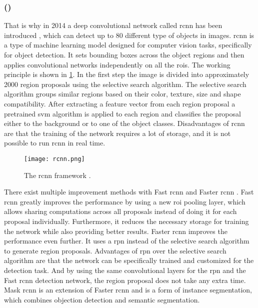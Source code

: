 \subsubsection{ ()}
\label{sssec:rcnn}
That is why in 2014 a deep convolutional network called \gls{rcnn} has been introduced \cite{Girshick2014}, which can detect up to 80 different type of objects in images.
\gls{rcnn} is a type of machine learning model designed for computer vision tasks, specifically for object detection.
It sets bounding boxes across the object regions and then applies convolutional networks independently on all the \glspl{roi}.
The working principle is shown in \cref{fig:rcnn}.
In the first step the image is divided into approximately 2000 region proposals using the selective search algorithm.
The selective search algorithm groups similar regions based on their color, texture, size and shape compatibility.
After extracting a feature vector from each region proposal a pretrained \gls{svm} algorithm is applied to each region and classifies the proposal either to the background or to one of the object classes.
Disadvantages of \gls{rcnn} are that the training of the network requires a lot of storage, and it is not possible to run \gls{rcnn} in real time.
\begin{figure}[htbp]
	\centering
	\texttt{[image: rcnn.png]}
	\caption[\acrshort{rcnn} framework]{The \acrshort{rcnn} framework \cite{Girshick2014}.}
	\label{fig:rcnn}
\end{figure}
There exist multiple improvement methods with Fast \gls{rcnn} \cite{Girshick2015} and Faster \gls{rcnn} \cite{Ren2017}.
Fast \gls{rcnn} greatly improves the performance by using a new \gls{roi} pooling layer, which allows sharing computations across all proposals instead of doing it for each proposal individually.
Furthermore, it reduces the necessary storage for training the network while also providing better results.
Faster \gls{rcnn} improves the performance even further.
It uses a \gls{rpn} instead of the selective search algorithm to generate region proposals.
Advantages of \gls{rpn} over the selective search algorithm are that the network can be specifically trained and customized for the detection task.
And by using the same convolutional layers for the \gls{rpn} and the Fast \gls{rcnn} detection network, the region proposal does not take any extra time.\\
Mask \gls{rcnn} \cite{He2017} is an extension of Faster \gls{rcnn} and is a form of instance segmentation, which combines objection detection and semantic segmentation.
